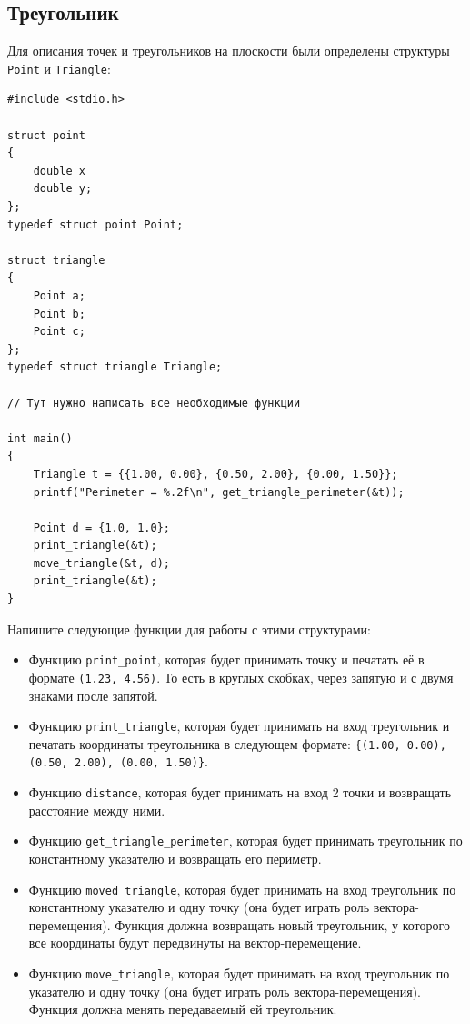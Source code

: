 \documentclass[10pt]{article}
\begin{document}
\subsection{Треугольник}
Для описания точек и треугольников на плоскости были определены структуры \texttt{Point} и \texttt{Triangle}:
\begin{lstlisting}
#include <stdio.h>

struct point 
{
    double x
    double y;
};
typedef struct point Point;

struct triangle 
{
    Point a;
    Point b;
    Point c;
};
typedef struct triangle Triangle;

// Тут нужно написать все необходимые функции

int main()
{
    Triangle t = {{1.00, 0.00}, {0.50, 2.00}, {0.00, 1.50}};
    printf("Perimeter = %.2f\n", get_triangle_perimeter(&t));
    
    Point d = {1.0, 1.0};
    print_triangle(&t);
    move_triangle(&t, d);
    print_triangle(&t);
}

\end{lstlisting}
Напишите следующие функции для работы с этими структурами:
\begin{itemize}
\item Функцию \texttt{print\_point}, которая будет принимать точку и печатать её в формате \texttt{(1.23, 4.56)}. То есть в круглых скобках, через запятую и с двумя знаками после запятой.

\item Функцию \texttt{print\_triangle}, которая будет принимать на вход треугольник и печатать координаты треугольника в следующем формате: \texttt{\{(1.00, 0.00), (0.50, 2.00), (0.00, 1.50)\}}.

\item Функцию \texttt{distance}, которая будет принимать на вход 2 точки и возвращать расстояние между ними.

\item Функцию \texttt{get\_triangle\_perimeter}, которая будет принимать треугольник по константному указателю и возвращать его периметр.

\item Функцию \texttt{moved\_triangle}, которая будет принимать на вход треугольник по константному указателю и одну точку (она будет играть роль вектора-перемещения). Функция должна возвращать новый треугольник, у которого все координаты будут передвинуты на вектор-перемещение.

\item Функцию \texttt{move\_triangle}, которая будет принимать на вход треугольник по указателю и одну точку (она будет играть роль вектора-перемещения). Функция должна менять передаваемый ей треугольник.
\end{itemize}
\end{document}
